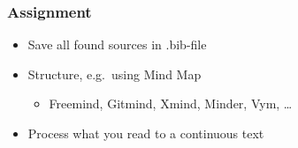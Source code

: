 \documentclass[aspectratio=169]{beamer}
\begin{document}
\begin{frame}
    \frametitle{Assignment}
    
    \begin{itemize}
        \item Save all found sources in .bib-file
        \item Structure, e.g.\ using Mind Map
        \begin{itemize}
            \item Freemind, Gitmind, Xmind, Minder, Vym, \ldots
        \end{itemize}
        \item Process what you read to a continuous text
    \end{itemize}
    
    \bigskip
    
\end{frame}
\end{document}

